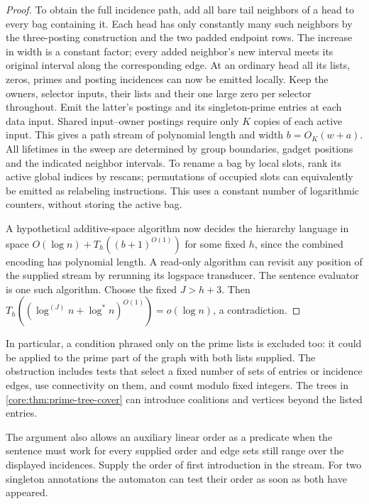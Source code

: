 \begin{proof}
To obtain the full incidence path, add all bare tail neighbors of
a head to every bag containing it. Each head has only constantly
many such neighbors by the three-posting construction and the two
padded endpoint rows. The increase in width is a constant factor;
every added neighbor's new interval meets its original interval
along the corresponding edge. At an ordinary head all its lists,
zeros, primes and posting incidences can now be emitted locally.
Keep the owners, selector inputs, their lists and their one large
zero per selector throughout. Emit the latter's postings and its
singleton-prime entries at each data input. Shared input--owner
postings require only $K$ copies of each active input. This gives
a path stream of polynomial length and width $b=O_K(w+a)$.
All lifetimes in the sweep are determined by group boundaries,
gadget positions and the indicated neighbor intervals. To rename
a bag by local slots, rank its active global indices by rescans;
permutations of occupied slots can equivalently be emitted as
relabeling instructions. This uses a constant number of logarithmic
counters, without storing the active bag.

A hypothetical additive-space algorithm now decides the hierarchy
language in space $O(\log n)+T_h((b+1)^{O(1)})$ for some fixed $h$,
since the combined encoding has polynomial length. A read-only
algorithm can revisit any position of the supplied stream by rerunning
its logspace transducer. The sentence evaluator is one such algorithm.
Choose the fixed $J>h+3$.
Then $T_h((\log^{(J)}n+\log^*n)^{O(1)})=o(\log n)$,
a contradiction.
\end{proof}

In particular, a condition phrased only on the prime lists is
excluded too: it could be applied to the prime part of the graph
with both lists supplied. The obstruction includes tests that select
a fixed number of sets of entries or incidence edges, use connectivity
on them, and count modulo fixed integers. The trees in
\cref{core:thm:prime-tree-cover} can introduce coalitions and
vertices beyond the listed entries.

The argument also allows an auxiliary linear order as a predicate
when the sentence must work for every supplied order and edge sets
still range over the displayed incidences. Supply the order of
first introduction in the stream. For two singleton annotations the
automaton can test their order as soon as both have appeared.
